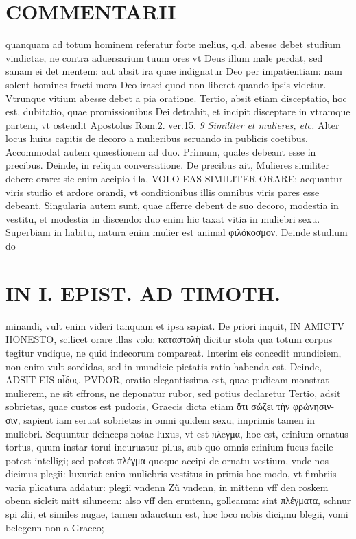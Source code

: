 \documentclass{article}
\begin{document}
\begin{pages}
\section*{COMMENTARII }
\marginpar{[ p.5 ]}\pstart quanquam ad totum hominem referatur forte melius, q.d. abesse debet studium vindictae, ne contra aduersarium tuum ores vt Deus illum male perdat, sed sanam ei det mentem: aut absit ira quae indignatur Deo per impatientiam: nam solent homines fracti mora Deo irasci quod non liberet quando ipsis videtur. Vtrunque vitium abesse debet a pia oratione. Tertio, absit etiam disceptatio, hoc est, dubitatio, quae promissionibus Dei detrahit, et incipit disceptare in vtramque partem, vt ostendit Apostolus Rom.2. ver.15.  \pend
\textit{9 Similiter et mulieres, etc. }\pstart Alter locus huius capitis de decoro a mulieribus seruando in publicis coetibus. Accommodat autem quaestionem ad duo. Primum, quales debeant esse in precibus. Deinde, in reliqua conversatione.  \pend\pstart De precibus ait, Mulieres similiter debere orare: sic enim accipio illa, VOLO EAS SIMILITER ORARE: aequantur viris studio et ardore orandi, vt conditionibus illis omnibus viris pares esse debeant. Singularia autem sunt, quae afferre debent de suo decoro, modestia in vestitu, et modestia in discendo: duo enim hic taxat vitia in muliebri sexu. Superbiam in habitu, natura enim mulier est animal φιλόκοσμον. Deinde studium do\pend
\section*{IN I. EPIST. AD TIMOTH. }
\marginpar{[ p.55 ]}\pstart minandi, vult enim videri tanquam et ipsa sapiat.  \pend\pstart De priori inquit, IN AMICTV HONESTO, scilicet orare illas volo: καταστολὴ dicitur stola qua totum corpus tegitur vndique, ne quid indecorum compareat. Interim eis concedit mundiciem, non enim vult sordidas, sed in mundicie pietatis ratio habenda est.  \pend\pstart Deinde, ADSIT EIS αἶδος, PVDOR, oratio elegantissima est, quae pudicam monstrat mulierem, ne sit effrons, ne deponatur rubor, sed potius declaretur  \pend\pstart Tertio, adsit sobrietas, quae custos est pudoris, Graecis dicta etiam ὅτι σώζει τὴν φρώνησιν- σιν, sapient iam seruat sobrietas in omni quidem sexu, imprimis tamen in muliebri.  \pend\pstart Sequuntur deinceps notae luxus, vt est πλeγμα, hoc est, crinium ornatus tortus, quum instar torui incuruatur pilus, sub quo omnis crinium fucus facile potest intelligi; sed potest πλέγμα quoque accipi de ornatu vestium, vnde nos dicimus plegii: luxuriat enim muliebris vestitus in primis hoc modo, vt fimbriis varia plicatura addatur: plegii vndenn Zũ vndenn, in mittenn vff den roskem obenn sicleit mitt siluneem: also vff den ermtenn, golleamm: sint πλέγματα, schnur spi zlii, et similes nugae, tamen adauctum est, hoc loco nobis dici,mu blegii, vomi belegenn non a Graeco;  \pend

\end{pages}
\end{document}
